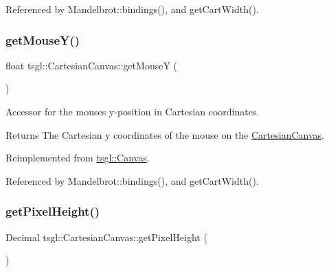 Referenced by Mandelbrot\+::bindings(), and get\+Cart\+Width().

\mbox{\label{classtsgl_1_1_cartesian_canvas_a4513bbe2483ebf043aabb200c1a8d456}} 
\subsubsection{\texorpdfstring{get\+Mouse\+Y()}{getMouseY()}}
{\footnotesize\ttfamily float tsgl\+::\+Cartesian\+Canvas\+::get\+MouseY (\begin{DoxyParamCaption}{ }\end{DoxyParamCaption})\hspace{0.3cm}{\ttfamily [virtual]}}



Accessor for the mouse\textquotesingle{}s y-\/position in Cartesian coordinates. 

\begin{DoxyReturn}{Returns}
The Cartesian y coordinates of the mouse on the \hyperlink{classtsgl_1_1_cartesian_canvas}{Cartesian\+Canvas}. 
\end{DoxyReturn}


Reimplemented from \hyperlink{classtsgl_1_1_canvas_a5e86e0938a5c228c1c947f995389bd45}{tsgl\+::\+Canvas}.



Referenced by Mandelbrot\+::bindings(), and get\+Cart\+Width().

\mbox{\label{classtsgl_1_1_cartesian_canvas_a699c2b41b3b46bfac8649fb38b24c901}} 
\subsubsection{\texorpdfstring{get\+Pixel\+Height()}{getPixelHeight()}}
{\footnotesize\ttfamily Decimal tsgl\+::\+Cartesian\+Canvas\+::get\+Pixel\+Height (\begin{DoxyParamCaption}{ }\end{DoxyParamCaption})\hspace{0.3cm}{\ttfamily [inline]}}



